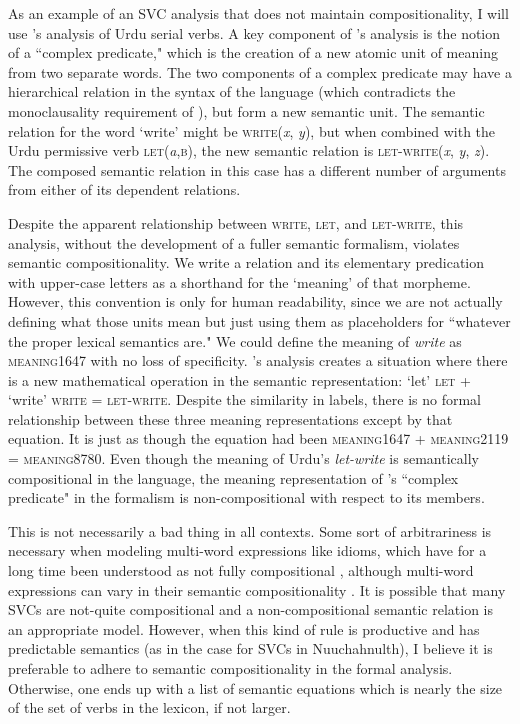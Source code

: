 As an example of an SVC analysis that does not maintain compositionality, I will use \cite{butt1995}'s analysis of Urdu serial verbs.  A key component of \citeauthor{butt1995}'s analysis is the notion of a ``complex predicate," which is the creation of a new atomic unit of meaning from two separate words. The two components of a complex predicate may have a hierarchical relation in the syntax of the language (which contradicts the monoclausality requirement of \cite{aikhenvalddixon2006}), but form a new semantic unit. The semantic relation for the word `write' might be \textsc{write}(\textit{x}, \textit{y}), but when combined with the Urdu permissive verb \textsc{let}(\textit{a},\textsc{b}), the new semantic relation is \textsc{let-write}(\textit{x}, \textit{y}, \textit{z}). The composed semantic relation in this case has a different number of arguments from either of its dependent relations.

Despite the apparent relationship between \textsc{write}, \textsc{let}, and \textsc{let-write}, this analysis, without the development of a fuller semantic formalism, violates semantic compositionality. We write a relation and its elementary predication with upper-case letters as a shorthand for the `meaning' of that morpheme. However, this convention is only for human readability, since we are not actually defining what those units mean but just using them as placeholders for ``whatever the proper lexical semantics are." We could define the meaning of \textit{write} as \textsc{meaning1647} with no loss of specificity. \citeauthor{butt1995}'s analysis creates a situation where there is a new mathematical operation in the semantic representation: `let' \textsc{let} + `write' \textsc{write} = \textsc{let-write}. Despite the similarity in labels, there is no formal relationship between these three meaning representations except by that equation. It is just as though the equation had been \textsc{meaning1647} + \textsc{meaning2119} = \textsc{meaning8780}. Even though the meaning of Urdu's \textit{let-write} is semantically compositional in the language, the meaning representation of \citeauthor{butt1995}'s ``complex predicate" in the formalism is non-compositional with respect to its members.

This is not necessarily a bad thing in all contexts. Some sort of arbitrariness is necessary when modeling multi-word expressions like idioms, which have for a long time been understood as not fully compositional \citep{chafe1968}, although multi-word expressions can vary in their semantic compositionality \citep{nunberg1994}. It is possible that many SVCs are not-quite compositional and a non-compositional semantic relation is an appropriate model. However, when this kind of rule is productive and has predictable semantics (as in the case for SVCs in Nuuchahnulth), I believe it is preferable to adhere to semantic compositionality in the formal analysis. Otherwise, one ends up with a list of semantic equations which is nearly the size of the set of verbs in the lexicon, if not larger.

